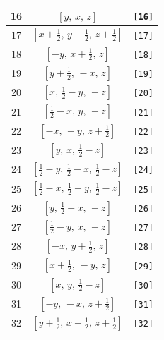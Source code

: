 \documentclass[fleqn,8pt]{jsarticle}
\begin{document}
\begin{longtable}{ccc}
16 & $\left[ y,\, x,\, z \right]$ & {\tt [16]} \\ \hline
17 & $\left[ x + \frac{1}{2},\, y + \frac{1}{2},\, z + \frac{1}{2} \right]$ & {\tt [17]} \\ \hline
18 & $\left[ - y,\, x + \frac{1}{2},\, z \right]$ & {\tt [18]} \\ \hline
19 & $\left[ y + \frac{1}{2},\, - x,\, z \right]$ & {\tt [19]} \\ \hline
20 & $\left[ x,\, \frac{1}{2} - y,\, - z \right]$ & {\tt [20]} \\ \hline
21 & $\left[ \frac{1}{2} - x,\, y,\, - z \right]$ & {\tt [21]} \\ \hline
22 & $\left[ - x,\, - y,\, z + \frac{1}{2} \right]$ & {\tt [22]} \\ \hline
23 & $\left[ y,\, x,\, \frac{1}{2} - z \right]$ & {\tt [23]} \\ \hline
24 & $\left[ \frac{1}{2} - y,\, \frac{1}{2} - x,\, \frac{1}{2} - z \right]$ & {\tt [24]} \\ \hline
25 & $\left[ \frac{1}{2} - x,\, \frac{1}{2} - y,\, \frac{1}{2} - z \right]$ & {\tt [25]} \\ \hline
26 & $\left[ y,\, \frac{1}{2} - x,\, - z \right]$ & {\tt [26]} \\ \hline
27 & $\left[ \frac{1}{2} - y,\, x,\, - z \right]$ & {\tt [27]} \\ \hline
28 & $\left[ - x,\, y + \frac{1}{2},\, z \right]$ & {\tt [28]} \\ \hline
29 & $\left[ x + \frac{1}{2},\, - y,\, z \right]$ & {\tt [29]} \\ \hline
30 & $\left[ x,\, y,\, \frac{1}{2} - z \right]$ & {\tt [30]} \\ \hline
31 & $\left[ - y,\, - x,\, z + \frac{1}{2} \right]$ & {\tt [31]} \\ \hline
32 & $\left[ y + \frac{1}{2},\, x + \frac{1}{2},\, z + \frac{1}{2} \right]$ & {\tt [32]} \\
\end{longtable}
\end{document}
